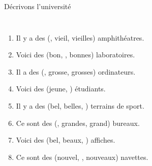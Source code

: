 \begin{frame}{Décrivons l'université}
  \begin{columns}
      {\scriptsize
      \begin{enumerate}
        \item Il y a des (, vieil, vieilles) amphithéatres.
        \item Voici des (bon, , bonnes) laboratoires.
        \item Il a des (, grosse, grosses) ordinateurs.
        \item Voici des (jeune, ) étudiants.
        \item Il y a des (bel, belles, ) terrains de sport.
        \item Ce sont des (, grandes, grand) bureaux.
        \item Voici des (bel, beaux, ) affiches.
        \item Ce sont des (nouvel, , nouveaux) navettes.
      \end{enumerate}
      }
      \begin{minipage}[c][0.6\textheight]{\linewidth}
        \begin{center}
        \end{center}
      \end{minipage}
  \end{columns}
\end{frame}